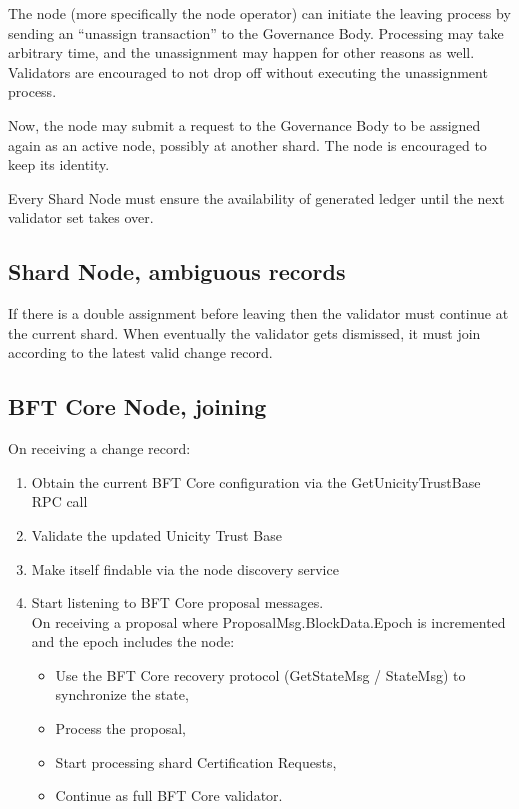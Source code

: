 The node (more specifically the node operator) can initiate the leaving process by sending an ``unassign transaction'' to the Governance Body. Processing may take arbitrary time, and the unassignment may happen for other reasons as well. Validators are encouraged to not drop off without executing the unassignment process.

Now, the node may submit a request to the Governance Body to be assigned again as an active node, possibly at another shard. The node is encouraged to keep its identity.

\begin{ruledef*}
  Every Shard Node must ensure the availability of generated ledger until the next validator set takes over.
\end{ruledef*}

\subsection{Shard Node, ambiguous records}

If there is a double assignment before leaving then the validator must continue at the current shard. When eventually the validator gets dismissed, it must join according to the latest valid change record.


\subsection{BFT Core Node, joining}

\begin{shaded}
  On receiving a change record:
  \begin{enumerate}[nosep]
    \item Obtain the current BFT Core configuration via the GetUnicityTrustBase RPC call
    \item Validate the updated Unicity Trust Base
    \item Make itself findable via the node discovery service
    \item Start listening to BFT Core proposal messages.\\
          On receiving a proposal where ProposalMsg.BlockData.Epoch is incremented and the epoch includes the node:
          \begin{itemize}[nosep]
            \item Use the BFT Core recovery protocol (GetStateMsg / StateMsg) to synchronize the state,
            \item Process the proposal,
            \item Start processing shard Certification Requests,
            \item Continue as full BFT Core validator.
          \end{itemize}
  \end{enumerate}
\end{shaded}

